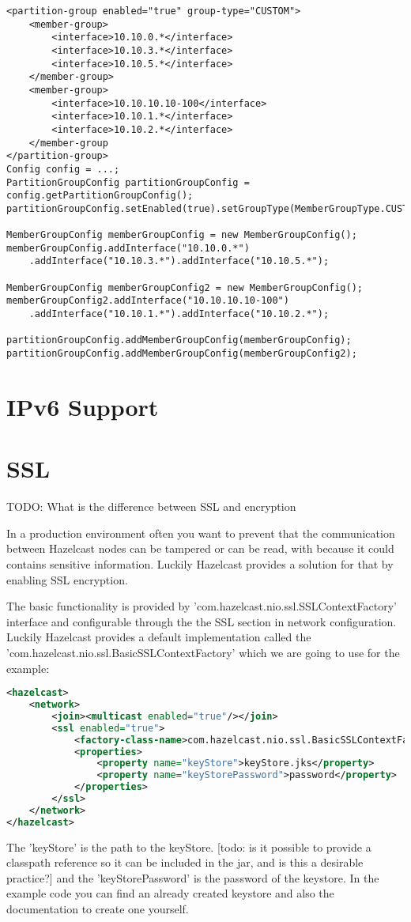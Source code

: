 \begin{lstlisting}
<partition-group enabled="true" group-type="CUSTOM">
    <member-group>
        <interface>10.10.0.*</interface>
        <interface>10.10.3.*</interface>
        <interface>10.10.5.*</interface>
    </member-group>
    <member-group>
        <interface>10.10.10.10-100</interface>
        <interface>10.10.1.*</interface>
        <interface>10.10.2.*</interface>
    </member-group
</partition-group>
Config config = ...;
PartitionGroupConfig partitionGroupConfig = config.getPartitionGroupConfig();
partitionGroupConfig.setEnabled(true).setGroupType(MemberGroupType.CUSTOM);

MemberGroupConfig memberGroupConfig = new MemberGroupConfig();
memberGroupConfig.addInterface("10.10.0.*")
    .addInterface("10.10.3.*").addInterface("10.10.5.*");

MemberGroupConfig memberGroupConfig2 = new MemberGroupConfig();
memberGroupConfig2.addInterface("10.10.10.10-100")
    .addInterface("10.10.1.*").addInterface("10.10.2.*");

partitionGroupConfig.addMemberGroupConfig(memberGroupConfig);
partitionGroupConfig.addMemberGroupConfig(memberGroupConfig2);
\end{lstlisting}

\section{IPv6 Support}

\section{SSL}
TODO: What is the difference between SSL and encryption

In a production environment often you want to prevent that the communication between Hazelcast nodes can be tampered or can be read, with because it could contains sensitive information. Luckily Hazelcast provides a solution for that by enabling SSL encryption.

The basic functionality is provided by 'com.hazelcast.nio.ssl.SSLContextFactory' interface and configurable through the the SSL section in network configuration. Luckily Hazelcast provides a default implementation called the 'com.hazelcast.nio.ssl.BasicSSLContextFactory' which we are going to use for the example:
\begin{lstlisting}[language=xml]
<hazelcast>
    <network>
        <join><multicast enabled="true"/></join>
        <ssl enabled="true">
            <factory-class-name>com.hazelcast.nio.ssl.BasicSSLContextFactory</factory-class-name>
            <properties>
                <property name="keyStore">keyStore.jks</property>
                <property name="keyStorePassword">password</property>
            </properties>
        </ssl>
    </network>
</hazelcast>
\end{lstlisting}
The 'keyStore' is the path to the keyStore. [todo: is it possible to provide a classpath reference so it can be included in the jar, and is this a desirable practice?] and the 'keyStorePassword' is the password of the keystore. In the example code you can find an already created keystore and also the documentation to create one yourself.

